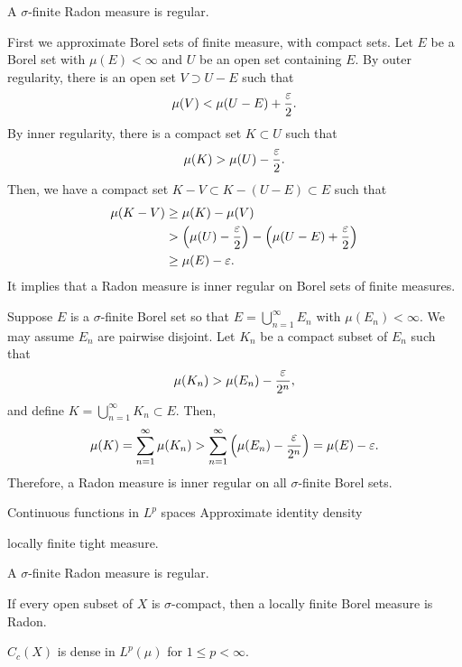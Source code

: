 \documentclass{../../large}
\begin{document}
\begin{prop}
A $\sigma$-finite Radon measure is regular.
\end{prop}
\begin{pf}
First we approximate Borel sets of finite measure, with compact sets.
Let $E$ be a Borel set with $\mu(E)<\infty$ and $U$ be an open set containing $E$.
By outer regularity, there is an open set $V\supset U-E$ such that
\[\mu(V)<\mu(U-E)+\frac{\varepsilon}2.\]
By inner regularity, there is a compact set $K\subset U$ such that
\[\mu(K)>\mu(U)-\frac{\varepsilon}2.\]
Then, we have a compact set $K-V\subset K-(U-E)\subset E$ such that
\begin{align*}
\mu(K-V)&\ge\mu(K)-\mu(V)\\
&>\left(\mu(U)-\frac{\varepsilon}2\right)-\left(\mu(U-E)+\frac{\varepsilon}2\right)\\
&\ge\mu(E)-\varepsilon.
\end{align*}
It implies that a Radon measure is inner regular on Borel sets of finite measures.

Suppose $E$ is a $\sigma$-finite Borel set so that $E=\bigcup_{n=1}^\infty E_n$ with $\mu(E_n)<\infty$.
We may assume $E_n$ are pairwise disjoint.
Let $K_n$ be a compact subset of $E_n$ such that
\[\mu(K_n)>\mu(E_n)-\frac{\varepsilon}{2^n},\]
and define $K=\bigcup_{n=1}^\infty K_n\subset E$.
Then,
\[\mu(K)=\sum_{n=1}^\infty\mu(K_n)>\sum_{n=1}^\infty\left(\mu(E_n)-\frac{\varepsilon}{2^n}\right)=\mu(E)-\varepsilon.\]
Therefore, a Radon measure is inner regular on all $\sigma$-finite Borel sets.
\end{pf}






Continuous functions in $L^p$ spaces
Approximate identity
density







locally finite tight measure.


\begin{prb}
\begin{parts}
\item A $\sigma$-finite Radon measure is regular.
\item If every open subset of $X$ is $\sigma$-compact, then a locally finite Borel measure is Radon.
\item $C_c(X)$ is dense in $L^p(\mu)$ for $1\le p<\infty$.
\end{parts}
\end{prb}
\end{document}
